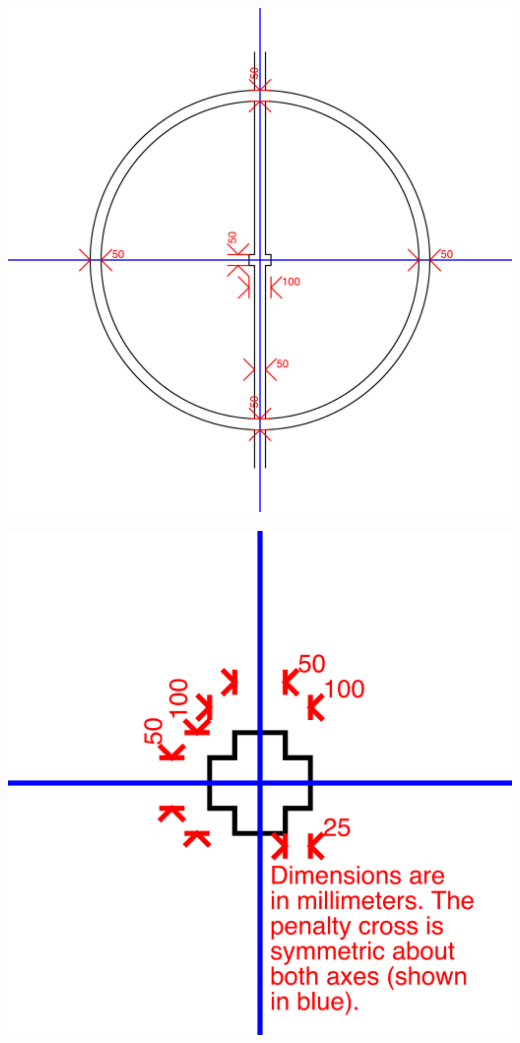 \clearpage
\centerline{\includegraphics[angle=90,origin=c,width=0.5\columnwidth]{figs/fieldDimensions2020_technical_cc.pdf}}

\centerline{\includegraphics[origin=c,width=0.5\columnwidth]{figs/fieldDimensions2020_technical_pc.pdf}}
